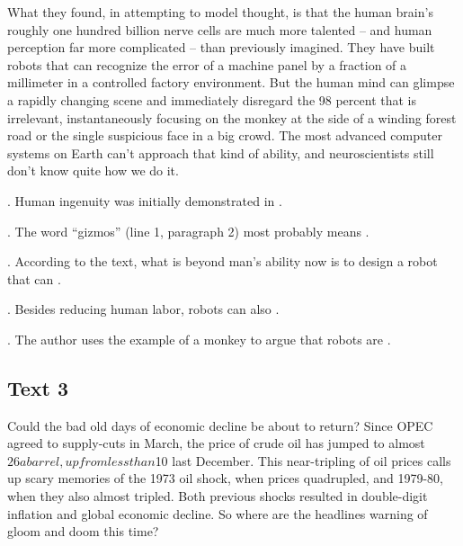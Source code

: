 What they found, in attempting to model thought, is that the human brain’s roughly one hundred billion nerve cells are much more talented -- and human perception far more complicated -- than previously imagined. They have built robots that can recognize the error of a machine panel by a fraction of a millimeter in a controlled factory environment. But the human mind can glimpse a rapidly changing scene and immediately disregard the 98 percent that is irrelevant, instantaneously focusing on the monkey at the side of a winding forest road or the single suspicious face in a big crowd. The most advanced computer systems on Earth can’t approach that kind of ability, and neuroscientists still don’t know quite how we do it.
\begin{questions} 
.	Human ingenuity was initially demonstrated in \ltk{}.\\

.	The word “gizmos” (line 1, paragraph 2) most probably means \ltk{}.\\

.	According to the text, what is beyond man’s ability now is to design a robot that can \ltk{}.\\

.	Besides reducing human labor, robots can also \ltk{}.\\

.	The author uses the example of a monkey to argue that robots are \ltk{}.\\
\end{questions}

\subsection{Text 3}
Could the bad old days of economic decline be about to return? Since OPEC agreed to supply-cuts in March, the price of crude oil has jumped to almost $26 a barrel, up from less than $10 last December. This near-tripling of oil prices calls up scary memories of the 1973 oil shock, when prices quadrupled, and 1979-80, when they also almost tripled. Both previous shocks resulted in double-digit inflation and global economic decline. So where are the headlines warning of gloom and doom this time?

